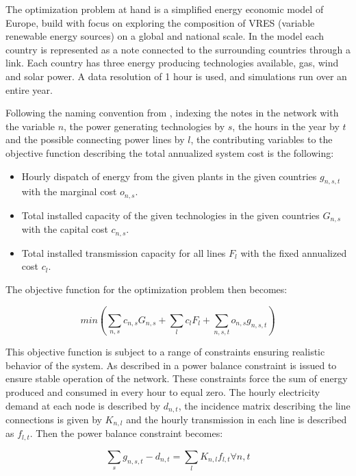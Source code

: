 The optimization problem at hand is a simplified energy economic model of Europe, build with focus on exploring the composition of VRES (variable renewable energy sources) on a global and national scale. In the model each country is represented as a note connected to the surrounding countries through a link. Each country has three energy producing technologies available, gas, wind and solar power. A data resolution of 1 hour is used, and simulations run over an entire year. 

Following the naming convention from \cite{PypsaModel}, indexing the notes in the network with the variable $n$, the power generating technologies by $s$, the hours in the year by $t$ and the possible connecting power lines by $l$, the contributing variables to the objective function describing the total annualized system cost is the following: 

\begin{itemize}
    \item Hourly dispatch of energy from the given plants in the given countries $g_{n,s,t}$ with the marginal cost $o_{n,s}$.
    \item Total installed capacity of the given technologies in the given countries $G_{n,s}$ with the capital cost $c_{n,s}$.
    \item Total installed transmission capacity for all lines $F_{l}$ with the fixed annualized cost $c_{l}$.

\end{itemize}

The objective function for the optimization problem then becomes: 

\begin{equation}
    min \left( \sum_{n,s} c_{n,s} G_{n,s} + \sum_l c_l F_l + \sum_{n,s,t} o_{n,s} g_{n,s,t} \right)
\end{equation}{}

This objective function is subject to a range of constraints ensuring realistic behavior of the system. As described in \cite{PypsaModel} a power balance constraint is issued to ensure stable operation of the network. These constraints force the sum of energy produced and consumed in every hour to equal zero. The hourly electricity demand at each node is described by $d_{n,t}$, the incidence matrix describing the line connections is given by $K_{n,l}$ and the hourly transmission in each line is described as $f_{l,t}$. Then the power balance constraint becomes:

\begin{equation}
\sum_s g_{n,s,t} - d_{n,t} = \sum_l K_{n,l} f_{l,t} \forall n,t
\end{equation}

